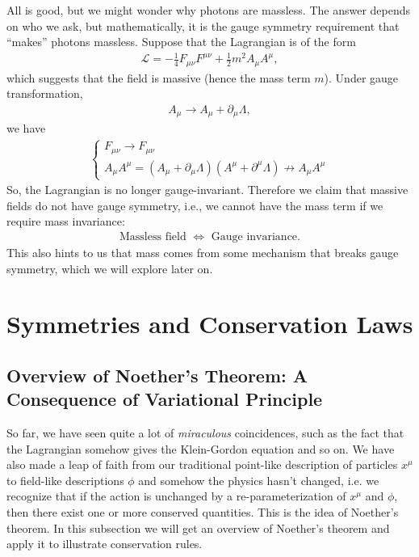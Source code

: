 \documentclass[a4paper,11pt]{article}
\numberwithin{equation}{section}
\theoremstyle{definition}
\newcommand{\p}{\partial}
\newcommand{\lag}{\mathcal{L}}
\begin{document}
All is good, but we might wonder why photons are massless. The answer depends on who we ask, but mathematically, it is the gauge symmetry requirement that ``makes'' photons massless. Suppose that the Lagrangian is of the form
\begin{align}
\lag = -\frac{1}{4}F_{\mu\nu}F^{\mu\nu}+ \frac{1}{2}m^2A_\mu A^\mu,
\end{align}
which suggests that the field is massive (hence the mass term $m$). Under gauge transformation,
\begin{align}
A_\mu \rightarrow A_\mu + \p_\mu \Lambda,
\end{align}
we have 
\begin{align}
\begin{cases}
F_{\mu\nu} \rightarrow F_{\mu\nu}\\
A_\mu A^\mu = (A_\mu + \p_\mu\Lambda)(A^\mu + \p^\mu\Lambda) \not\to A_\mu A^\mu
\end{cases}
\end{align}
So, the Lagrangian is no longer gauge-invariant. Therefore we claim that massive fields do not have gauge symmetry, i.e., we cannot have the mass term if we require mass invariance:
\begin{align}
\text{Massless field }\iff \text{ Gauge invariance}.
\end{align}
This also hints to us that mass comes from some mechanism that breaks gauge symmetry, which we will explore later on. 

\newpage

\section{Symmetries and Conservation Laws}
\subsection{Overview of Noether's Theorem: A Consequence of Variational Principle}
So far, we have seen quite a lot of \textit{miraculous} coincidences, such as the fact that the Lagrangian somehow gives the Klein-Gordon equation and so on. We have also made a leap of faith from our traditional point-like description of particles $x^\mu$ to field-like descriptions $\phi$ and somehow the physics hasn't changed, i.e. we recognize that if the action is unchanged by a re-parameterization of $x^\mu$ and $\phi$, then there exist one or more conserved quantities. This is the idea of Noether's theorem. In this subsection we will get an overview of Noether's theorem and apply it to illustrate conservation rules.\\
\end{document}
